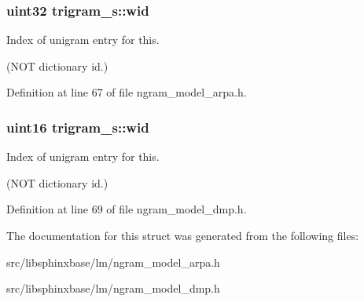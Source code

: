 \subsubsection[{wid}]{\setlength{\rightskip}{0pt plus 5cm}uint32 {\bf trigram\-\_\-s\-::wid}}\label{structtrigram__s_a492e1fedb16fa11d26a941177c1305be}


\-Index of unigram entry for this. 

(\-N\-O\-T dictionary id.) 

\-Definition at line 67 of file ngram\-\_\-model\-\_\-arpa.\-h.

\subsubsection[{wid}]{\setlength{\rightskip}{0pt plus 5cm}uint16 {\bf trigram\-\_\-s\-::wid}}\label{structtrigram__s_ad90726c9d1c5b2d564205b4feddcb674}


\-Index of unigram entry for this. 

(\-N\-O\-T dictionary id.) 

\-Definition at line 69 of file ngram\-\_\-model\-\_\-dmp.\-h.



\-The documentation for this struct was generated from the following files\-:\begin{DoxyCompactItemize}
\item 
src/libsphinxbase/lm/ngram\-\_\-model\-\_\-arpa.\-h\item 
src/libsphinxbase/lm/ngram\-\_\-model\-\_\-dmp.\-h\end{DoxyCompactItemize}
